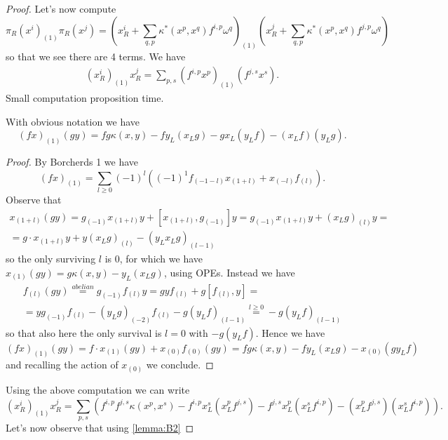 \documentclass[a4paper, 10pt]{article}
\begin{document}
\begin{proof}
                Let's now compute \[\pi_R(x^i)_{(1)}\pi_R(x^j) = \left(x^i_R + \sum_{q,p} \kappa^*(x^p, x^q)f^{i,p}\omega^q \right)_{(1)}\left(x^j_R + \sum_{q, p}\kappa^*(x^p, x^q)f^{j,p}\omega^q \right) \] so that we see there are 4 terms. We have 
                \begin{gather*}
                    (x^i_R)_{(1)}x^j_R = \sum_{p,s}(f^{i,p}x^p)_{(1)}(f^{j,s}x^s).
                \end{gather*}
                Small computation proposition time.
                \begin{prop}
                    With obvious notation we have \[(fx)_{(1)}(gy) = fg\kappa(x, y) -fy_L(x_Lg) - gx_L(y_Lf) - (x_Lf)(y_Lg).\]  
                \end{prop}
                \begin{proof}
                    By Borcherds 1 we have \[(fx)_{(1)} = \sum_{l \geq 0} (-1)^l((-1)^1f_{(-1-l)}x_{(1+l)} + x_{(-l)}f_{(l)}). \] Observe that 
                    \begin{gather*}
                        x_{(1+l)}(gy) = g_{(-1)}x_{(1+l)}y + [x_{(1+l)}, g_{(-1)}]y = g_{(-1)}x_{(1+l)}y + (x_Lg)_{(l)}y = \\ 
                        = g \cdot x_{(1+l)}y + y(x_Lg)_{(l)} - (y_Lx_Lg)_{(l-1)} 
                    \end{gather*}
                    so the only surviving $l$ is $0$, for which we have $x_{(1)}(gy) = g\kappa(x, y) - y_L(x_Lg)$, using OPEs.
                    Instead we have 
                    \begin{gather*}
                        f_{(l)}(gy) \stackrel{abelian}{=} g_{(-1)}f_{(l)}y = gyf_{(l)} + g[f_{(l)}, y] = \\ 
                        = yg_{(-1)}f_{(l)} - (y_Lg)_{(-2)}f_{(l)} - g(y_Lf)_{(l-1)}  \stackrel{l \geq 0}{=} -g(y_Lf)_{(l-1)}
                    \end{gather*}
                    so that also here the only survival is $l=0$ with $-g(y_Lf)$.
                    Hence we have \[(fx)_{(1)}(gy) = f\cdot x_{(1)}(gy) + x_{(0)}f_{(0)}(gy) = fg\kappa(x, y) - fy_L(x_Lg) - x_{(0)}(g y_Lf) \] and recalling the action of $x_{(0)}$ we conclude.
                \end{proof}
                Using the above computation we can write \[(x^i_R)_{(1)}x^j_R = \sum_{p,s} \left(f^{i, p}f^{j,s}\kappa(x^p, x^s) - f^{i,p}x^s_L(x^p_Lf^{j,s}) - f^{j,s}x^p_L(x^s_Lf^{i,p}) - (x^p_Lf^{j,s})(x^s_Lf^{i,p})\right). \] Let's now observe that using \cref{lemma:B2}

\end{proof}
\end{document}
